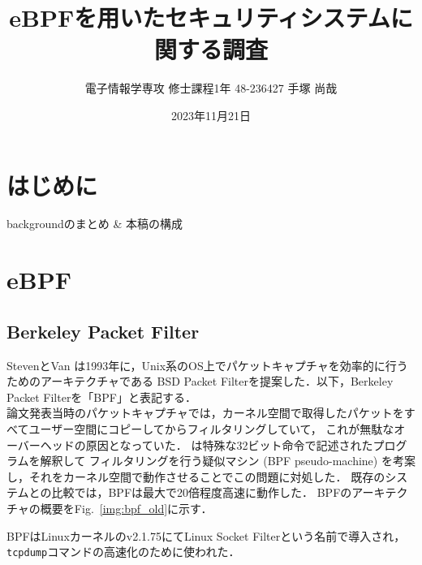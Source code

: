 \documentclass[platex,a4j,10pt,twoside,twocolumn,dvipdfmx]{jsarticle}
\title{eBPFを用いたセキュリティシステムに関する調査 \\
\large{\textgt{A Survey on Security Systems with eBPF}}}
\author{電子情報学専攻 修士課程1年 48-236427 手塚 尚哉}
\date{2023年11月21日}
\newcommand{\Fref}[1]{Fig.~\ref{#1}}
\begin{document}



\section{はじめに}
backgroundのまとめ \& 本稿の構成

\section{eBPF}
  \subsection{Berkeley Packet Filter}
    StevenとVan \cite{mccanne1993bsd}は1993年に，Unix系のOS上でパケットキャプチャを効率的に行うためのアーキテクチャである
    BSD Packet Filterを提案した．以下，Berkeley Packet Filterを「BPF」と表記する． \\
    論文発表当時のパケットキャプチャでは，カーネル空間で取得したパケットをすべてユーザー空間にコピーしてからフィルタリングしていて，
    これが無駄なオーバーヘッドの原因となっていた．
    \cite{mccanne1993bsd}は特殊な32ビット命令で記述されたプログラムを解釈して
    フィルタリングを行う疑似マシン (BPF pseudo-machine) を考案し，それをカーネル空間で動作させることでこの問題に対処した．
    既存のシステムとの比較では，BPFは最大で20倍程度高速に動作した．
    BPFのアーキテクチャの概要を\Fref{img:bpf_old}に示す．
    
    BPFはLinuxカーネルのv2.1.75にてLinux Socket Filterという名前で導入され，\texttt{tcpdump}コマンドの高速化のために使われた．
    
\end{document}
